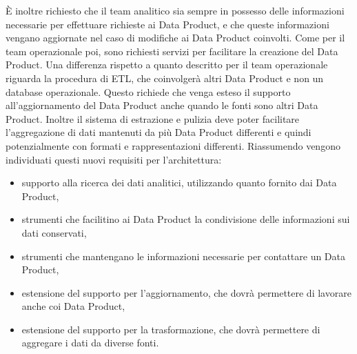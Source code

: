 \documentclass[12pt]{report}
\begin{document}
È inoltre richiesto che il team analitico sia sempre in possesso delle informazioni necessarie per effettuare richieste ai Data Product, e che queste informazioni vengano aggiornate nel caso di modifiche ai Data Product coinvolti.
Come per il team operazionale poi, sono richiesti servizi per facilitare la creazione del Data Product. 
Una differenza rispetto a quanto descritto per il team operazionale riguarda la procedura di ETL, che coinvolgerà altri Data Product e non un database operazionale.
Questo richiede che venga esteso il supporto all'aggiornamento del Data Product anche quando le fonti sono altri Data Product. 
Inoltre il sistema di estrazione e pulizia deve poter facilitare l'aggregazione di dati mantenuti da più Data Product differenti e quindi potenzialmente con formati e rappresentazioni differenti.
Riassumendo vengono individuati questi nuovi requisiti per l'architettura: 
\begin{itemize}
    \item supporto alla ricerca dei dati analitici, utilizzando quanto fornito dai Data Product,
    \item strumenti che facilitino ai Data Product la condivisione delle informazioni sui dati conservati,
    \item strumenti che mantengano le informazioni necessarie per contattare un Data Product,
    \item estensione del supporto per l'aggiornamento, che dovrà permettere di lavorare anche coi Data Product,
    \item estensione del supporto per la trasformazione, che dovrà permettere  di aggregare i dati da diverse fonti.
\end{itemize}
\end{document}
